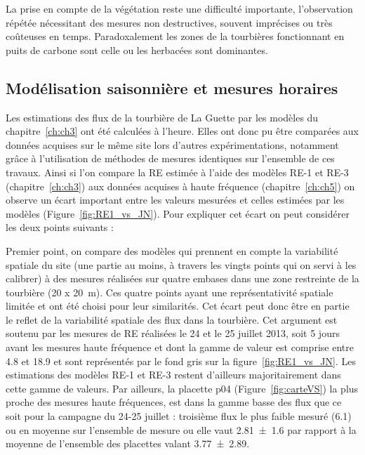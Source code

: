 La prise en compte de la végétation reste une difficulté importante, l'observation répétée nécessitant des mesures non destructives, souvent imprécises ou très coûteuses en temps.
Paradoxalement les zones de la tourbières fonctionnant en puits de carbone sont celle ou les herbacées sont dominantes.

\subsection*{Modélisation saisonnière et mesures horaires}

Les estimations des flux de la tourbière de La Guette par les modèles du chapitre~\ref{ch:ch3} ont été calculées à l'heure.
Elles ont donc pu être comparées aux données acquises sur le même site lors d'autres expérimentations, notamment grâce à l'utilisation de méthodes de mesures identiques sur l'ensemble de ces travaux.
Ainsi si l'on compare la RE estimée à l'aide des modèles RE-1 et RE-3 (chapitre~\ref{ch:ch3}) aux données acquises à haute fréquence (chapitre~\ref{ch:ch5}) on observe un écart important entre les valeurs mesurées et celles estimées par les modèles (Figure~\ref{fig:RE1_vs_JN}).
Pour expliquer cet écart on peut considérer les deux points suivants : 

Premier point, on compare des modèles qui prennent en compte la variabilité spatiale du site (une partie au moins, à travers les vingts points qui on servi à les calibrer) à des mesures réalisées sur quatre embases dans une zone restreinte de la tourbière (20 x \SI{20}{\metre}).
Ces quatre points ayant une représentativité spatiale limitée et ont été choisi pour leur similarités.
Cet écart peut donc être en partie le reflet de la variabilité spatiale des flux dans la tourbière.
Cet argument est soutenu par les mesures de RE réalisées le 24 et le 25 juillet 2013, soit 5 jours avant les mesures haute fréquence et dont la gamme de valeur est comprise entre \num{4.8} et \SI{18.9}{\uml} et sont représentés par le fond gris sur la figure~\ref{fig:RE1_vs_JN}.
Les estimations des modèles RE-1 et RE-3 restent d'ailleurs majoritairement dans cette gamme de valeurs.
Par ailleurs, la placette p04 (Figure~\ref{fig:carteVS}) la plus proche des mesures haute fréquences, est dans la gamme basse des flux que ce soit pour la campagne du 24-25 juillet : troisième flux le plus faible mesuré (\SI{6.1}{\uml}) ou en moyenne sur l'ensemble de mesure ou elle vaut \SI{2.81(160)}{\uml} par rapport à la moyenne de l'ensemble des placettes valant \SI{3.77(289)}{\uml}.

